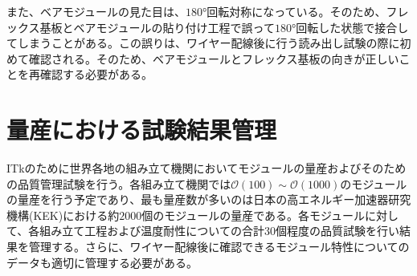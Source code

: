 また、ベアモジュールの見た目は、$180\si{\degree}$回転対称になっている。そのため、フレックス基板とベアモジュールの貼り付け工程で誤って$180\si{\degree}$回転した状態で接合してしまうことがある。この誤りは、ワイヤー配線後に行う読み出し試験の際に初めて確認される。そのため、ベアモジュールとフレックス基板の向きが正しいことを再確認する必要がある。

\section{量産における試験結果管理}
\label{sec:production-manage}

ITkのために世界各地の組み立て機関においてモジュールの量産およびそのための品質管理試験を行う。各組み立て機関では$\mathcal{O}(100)\sim \mathcal{O}(1000)$のモジュールの量産を行う予定であり、最も量産数が多いのは日本の高エネルギー加速器研究機構(KEK)における約$2000$個のモジュールの量産である。各モジュールに対して、各組み立て工程および温度耐性についての合計$30$個程度の品質試験を行い結果を管理する。さらに、ワイヤー配線後に確認できるモジュール特性についてのデータも適切に管理する必要がある。

